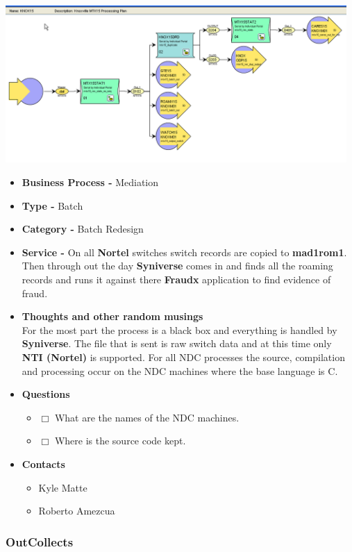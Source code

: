 \documentclass[12pt,twoside]{article}
\begin{document}
    \includegraphics[width=13cm]{Pictures/NDC.png}
\begin{itemize}
\item \textbf{Business Process -} Mediation
\item \textbf{Type -} Batch
\item \textbf{Category -} Batch Redesign
\item \textbf{Service -}   On all \textbf{Nortel} switches switch records are
           copied to \textbf{mad1rom1}. Then through out the day \textbf{Syniverse}
           comes in and finds all the roaming records and runs it
           against there \textbf{Fraudx} application to find evidence of
           fraud.
\item \textbf{Thoughts and other random musings} \\ For the most part
           the process is a black box and everything is handled by
           \textbf{Syniverse}. The file that is sent is raw switch data and at this time
           only \textbf{NTI (Nortel)} is supported. For all NDC processes the source,
           compilation and processing occur on the NDC machines where
           the base language is C.
\item \textbf{Questions}
\begin{itemize}
\item $\Box$ What are the names of the NDC machines.
\item $\Box$ Where is the source code kept.
\end{itemize}
\item \textbf{Contacts}
\begin{itemize}
\item Kyle Matte
\item Roberto Amezcua
\end{itemize}
\end{itemize}
\subsubsection{OutCollects}
\label{sec-6-8-2}
\end{document}

